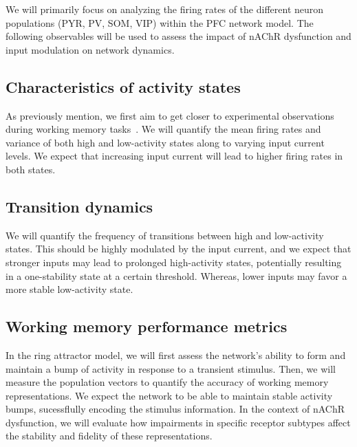 \documentclass[10pt,letterpaper]{article}
\begin{document}
We will primarily focus on analyzing the firing rates of the different neuron populations (PYR, PV, SOM, VIP) within the PFC network model. The following observables will be used to assess the impact of nAChR dysfunction and input modulation on network dynamics.

\subsection{Characteristics of activity states}
As previously mention, we first aim to get closer to experimental observations during working memory tasks~\citep{Compte2003}. We will quantify the mean firing rates and variance of both high and low-activity states along to varying input current levels. We expect that increasing input current will lead to higher firing rates in both states.

\subsection{Transition dynamics}
We will quantify the frequency of transitions between high and low-activity states. This should be highly modulated by the input current, and we expect that stronger inputs may lead to prolonged high-activity states, potentially resulting in a one-stability state at a certain threshold. Whereas, lower inputs may favor a more stable low-activity state.

\subsection{Working memory performance metrics}
In the ring attractor model, we will first assess the network's ability to form and maintain a bump of activity in response to a transient stimulus. Then, we will measure the population vectors to quantify the accuracy of working memory representations. We expect the network to be able to maintain stable activity bumps, sucessflully encoding the stimulus information. In the context of nAChR dysfunction, we will evaluate how impairments in specific receptor subtypes affect the stability and fidelity of these representations.



\end{document}
